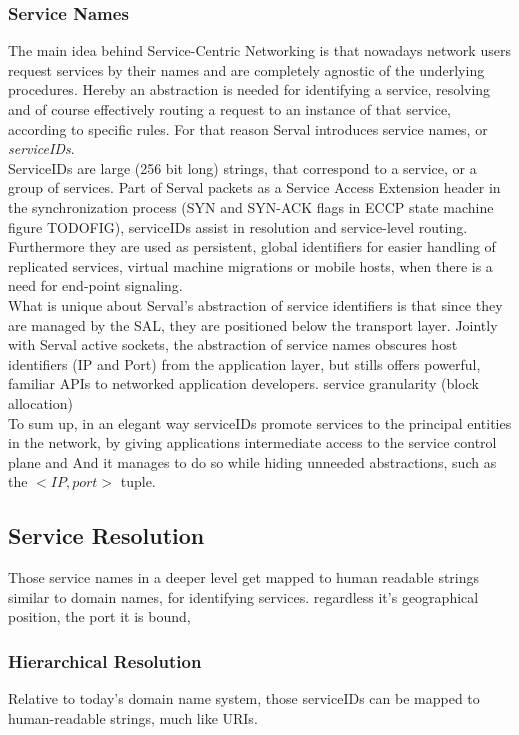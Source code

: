 \subsubsection{Service Names}
The main idea behind Service-Centric Networking is that nowadays network users request services by their names and are completely agnostic of the underlying procedures.
Hereby an abstraction is needed for identifying a service, resolving and of course effectively routing a request to an instance of that service, according to specific rules.
For that reason Serval introduces service names, or \emph{serviceIDs}.\\
\indent ServiceIDs are large (256 bit long) strings, that correspond to a service, or a group of services.
Part of Serval packets as a Service Access Extension header in the synchronization process (SYN and SYN-ACK flags in ECCP state machine figure TODOFIG), serviceIDs assist in resolution and service-level routing.
Furthermore they are used as persistent, global identifiers for easier handling of replicated services, virtual machine migrations or mobile hosts, when there is a need for end-point signaling.\\
\indent What is unique about Serval's abstraction of service identifiers is that since they are managed by the SAL, they are positioned below the transport layer.
Jointly with Serval active sockets, the abstraction of service names obscures host identifiers (IP and Port) from the application layer, but stills offers powerful, familiar APIs to networked application developers.
\indent service granularity (block allocation) \\
\indent To sum up, in an elegant way serviceIDs promote services to the principal entities in the network, by giving applications intermediate access to the service control plane and 
And it manages to do so while hiding unneeded abstractions, such as the $<IP, port>$ tuple.


\subsection{Service Resolution}
Those service names in a deeper level get mapped to 
human readable strings similar to domain names, for identifying services.
regardless it's geographical position, the port it is bound, 



\subsubsection{Hierarchical Resolution}
Relative to today's domain name system, those serviceIDs can be mapped to human-readable strings, much like URIs.



